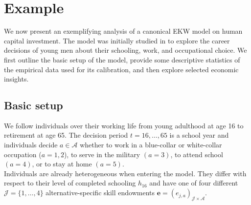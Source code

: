 \section{Example}\label{Example}
We now present an exemplifying analysis of a canonical EKW model on human capital investment. The model was initially studied in \citet{Keane.1997} to explore the career decisions of young men about their schooling, work, and occupational choice. We first outline the basic setup of the model, provide some descriptive statistics of the empirical data used for its calibration, and then explore selected economic insights.
\subsection{Basic setup}
We follow individuals over their working life from young adulthood at age 16 to retirement at age 65. The decision period $t = 16, \dots, 65$  is a school year and individuals decide $a\in\mathcal{A}$ whether to work in a blue-collar or white-collar occupation ($a = 1, 2$), to serve in the military $(a = 3)$, to attend school $(a = 4)$, or to stay at home $(a = 5)$.\\



\noindent Individuals are already heterogeneous when entering the model. They differ with respect to their level of completed schooling $h_{16}$ and have one of four different $\mathcal{J} = \{1, \hdots, 4\}$ alternative-specific skill endowments $\bm{e} = \left(e_{j,a}\right)_{\mathcal{J} \times \mathcal{A}}$.\\

